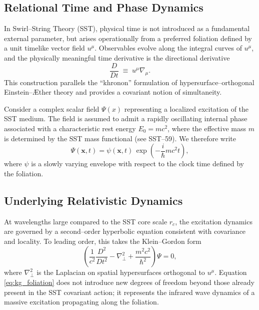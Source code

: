\documentclass[11pt]{article}
\begin{document}
        \subsection{Relational Time and Phase Dynamics}

            In Swirl--String Theory (SST), physical time is not introduced as a fundamental external parameter, but arises operationally from a preferred foliation defined by a unit timelike vector field $u^\mu$. Observables evolve along the integral curves of $u^\mu$, and the physically meaningful time derivative is the directional derivative
            \begin{equation}
                \frac{D}{Dt} \;\equiv\; u^\mu \nabla_\mu .
            \end{equation}
            This construction parallels the ``khronon'' formulation of hypersurface--orthogonal Einstein--\AE ther theory and provides a covariant notion of simultaneity.

            Consider a complex scalar field $\Psi(x)$ representing a localized excitation of the SST medium. The field is assumed to admit a rapidly oscillating internal phase associated with a characteristic rest energy $E_0 = m c^2$, where the effective mass $m$ is determined by the SST mass functional (see SST--59). We therefore write
            \begin{equation}
                \Psi(\mathbf{x},t)
                =
                \psi(\mathbf{x},t)\,
                \exp\!\left(-\frac{i}{\hbar} m c^2 t\right),
                \label{eq:phase_factorization}
            \end{equation}
            where $\psi$ is a slowly varying envelope with respect to the clock time defined by the foliation.

        \subsection{Underlying Relativistic Dynamics}

            At wavelengths large compared to the SST core scale $r_c$, the excitation dynamics are governed by a second--order hyperbolic equation consistent with covariance and locality. To leading order, this takes the Klein--Gordon form
            \begin{equation}
                \left(
                    \frac{1}{c^2} \frac{D^2}{Dt^2}
                    -
                    \nabla_\perp^2
                +
                    \frac{m^2 c^2}{\hbar^2}
                \right)\Psi
                =
                0,
                \label{eq:kg_foliation}
            \end{equation}
            where $\nabla_\perp^2$ is the Laplacian on spatial hypersurfaces orthogonal to $u^\mu$. Equation \eqref{eq:kg_foliation} does not introduce new degrees of freedom beyond those already present in the SST covariant action; it represents the infrared wave dynamics of a massive excitation propagating along the foliation.
\end{document}
